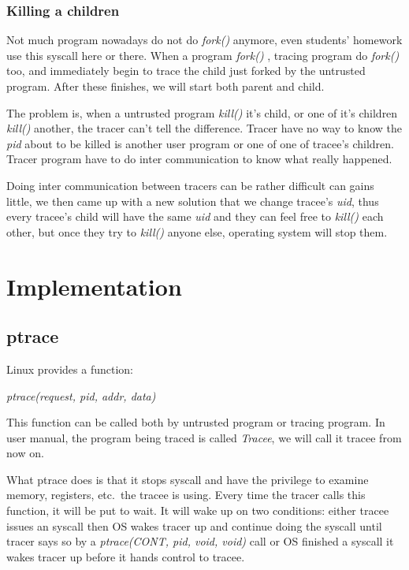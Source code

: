 \documentclass[conference,compsoc]{IEEEtran}
\begin{document}
		\subsubsection{Killing a children}
			\par 
				Not much program nowadays do not do \emph{ fork() } anymore, even students' homework use this syscall here or there. 
				When a program \emph{ fork() }, tracing program do \emph{ fork() } too, and immediately begin to trace the child just forked by the untrusted program. 
				After these finishes, we will start both parent and child.
			\par
				The problem is, when a untrusted program \emph{kill()} it's child, or one of it's children \emph{kill()} another, the tracer can't tell the difference. 
				Tracer have no way to know the \emph{pid} about to be killed is another user program or one of one of tracee's children. 
				Tracer program have to do inter communication to know what really happened.
			\par
				Doing inter communication between tracers can be rather difficult can gains little, we then came up with a new solution that we change tracee's \emph{uid}, thus every tracee's child will have the same \emph{uid} and they can feel free to \emph{kill()} each other, but once they try to \emph{kill()} anyone else, operating system will stop them.


\section{Implementation}


	\subsection{ptrace}

		\par
			Linux provides a function:\\
				\begin{center}
				\emph{ptrace(request, pid, addr, data)}
				\end{center}
			This function can be called both by untrusted program or tracing program. 
			In user manual, the program being traced is called \emph{Tracee}, we will call it tracee from now on.
		\par 
			What ptrace does is that it stops syscall and have the privilege to examine memory, registers, etc.\ the tracee is using. 
			Every time the tracer calls this function, it will be put to wait. 
			It will wake up on two conditions: either tracee issues an syscall then OS wakes tracer up and continue doing the syscall until tracer says so by a \emph{ptrace(CONT, pid, void, void)} call or OS finished a syscall it wakes tracer up before it hands control to tracee.
\end{document}
